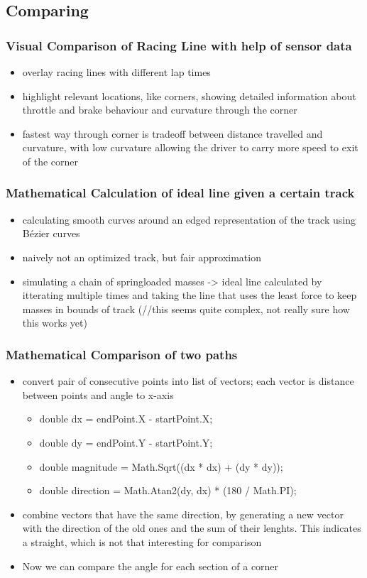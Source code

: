 \subsection{Comparing}
\subsubsection{Visual Comparison of Racing Line with help of sensor data}

\begin{itemize}
  \item overlay racing lines with different lap times
  \item highlight relevant locations, like corners, showing detailed information about throttle and brake behaviour and curvature through the corner
  \item fastest way through corner is tradeoff between distance travelled and curvature, with low curvature allowing the driver to carry more speed to exit of the corner
\end{itemize}

\subsubsection{Mathematical Calculation of ideal line given a certain track}
\begin{itemize}
  \item calculating smooth curves around an edged representation of the track using Bézier curves
  \item naively not an optimized track, but fair approximation
  \item simulating a chain of springloaded masses -> ideal line calculated by itterating multiple times and taking the line that uses the least force to keep masses in bounds of track (//this seems quite complex, not really sure how this works yet)
\end{itemize}

\subsubsection{Mathematical Comparison of two paths}
\begin{itemize}
  \item convert pair of consecutive points into list of vectors; each vector is distance between points and angle to x-axis
  \begin{itemize}
    \item double dx = endPoint.X - startPoint.X;
    \item double dy = endPoint.Y - startPoint.Y;
    \item double magnitude = Math.Sqrt((dx * dx) + (dy * dy));
    \item double direction = Math.Atan2(dy, dx) * (180 / Math.PI);
  \end{itemize}
  \item combine vectors that have the same direction, by generating a new vector with the direction of the old ones and the sum of their lenghts. This indicates a straight, which is not that interesting for comparison
  \item Now we can compare the angle for each section of a corner
\end{itemize}
\clearpage
